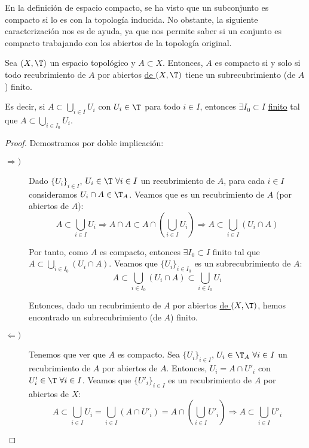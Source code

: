 En la definición de espacio compacto, se ha visto que un subconjunto es compacto si lo es con la topología inducida.
No obstante, la siguiente caracterización nos es de ayuda, ya que nos permite saber si un conjunto es compacto trabajando con los abiertos de la topología original.
\begin{prop}
    Sea $(X,\T)$ un espacio topológico y $A\subset X$.
    Entonces, $A$ es compacto si y solo si todo recubrimiento de $A$ por abiertos \ul{de $(X,\T)$} tiene un subrecubrimiento (de $A$) finito.

    Es decir, si $A\subset \bigcup\limits_{i\in I}U_i$ con $U_i\in \T$ para todo $i\in I$, entonces $\exists I_0\subset I$ \ul{finito} tal que $A\subset \bigcup\limits_{i\in I_0}U_i$.
\end{prop}
\begin{proof}
    Demostramos por doble implicación:
    \begin{description}
        \item[$\Longrightarrow)$] Dado $\{U_i\}_{i\in I}$, $U_i\in \T~\forall i\in I$ un recubrimiento de $A$, para cada $i\in I$ consideramos $U_i\cap A\in \T_A$. Veamos que es un recubrimiento de $A$ (por abiertos de $A$):
        \begin{equation*}
            A\subset \bigcup_{i\in I}U_i \Longrightarrow A\cap A \subset A \cap \left(\bigcup_{i\in I}U_i\right) \Longrightarrow A \subset \bigcup_{i\in I}(U_i\cap A)
        \end{equation*}

        Por tanto, como $A$ es compacto, entonces $\exists I_0\subset I$ finito tal que $A\subset \bigcup\limits_{i\in I_0}(U_i\cap A)$. Veamos que $\{U_i\}_{i\in I_0}$ es un subrecubrimiento de $A$:
        \begin{equation*}
            A\subset \bigcup_{i\in I_0}(U_i\cap A) \subset \bigcup_{i\in I_0}U_i
        \end{equation*}
        
        Entonces, dado un recubrimiento de $A$ por abiertos \ul{de $(X,\T)$}, hemos encontrado un subrecubrimiento (de $A$) finito.

        \item[$\Longleftarrow)$] Tenemos que ver que $A$ es compacto. Sea $\{U_i\}_{i\in I}$, $U_i\in \T_A~\forall i\in I$ un recubrimiento de $A$ por abiertos de $A$.
        Entonces, $U_i=A\cap U'_i$ con $U'_i\in \T~\forall i\in I$. Veamos que $\{U'_i\}_{i\in I}$ es un recubrimiento de $A$ por abiertos de $X$:
        \begin{equation*}
            A\subset \bigcup_{i\in I}U_i = \bigcup_{i\in I}(A\cap U'_i) = A\cap \left(\bigcup_{i\in I}U'_i\right) \Longrightarrow A \subset \bigcup_{i\in I}U'_i
        \end{equation*}


\end{description}
\end{proof}
